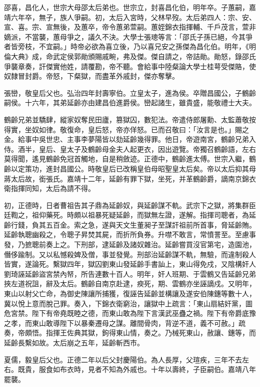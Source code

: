 \begin{pinyinscope}
邵喜，昌化人，世宗大母邵太后弟也。世宗立，封喜昌化伯，明年卒。子蕙嗣，嘉靖六年卒，無子，族人爭嗣。初，太后入宮時，父林早歿。太后弟四人：宗、安、宣、喜。宗、宣無後，及蕙卒，帝令蕙弟萱嗣。蕙姪錦衣指揮輔、千戶茂言，萱非嫡派，不當襲，蕙母爭之，議久不決。大學士張璁等言：「邵氏子孫已絕，今其爭者皆旁枝，不宜嗣。」時帝必欲為喜立後，乃以喜兄安之孫傑為昌化伯。明年，《明倫大典》成，命武定侯郭勛頒賜戚畹，弗及傑。傑自請之，帝詰勛。勛怒，錄邵氏爭襲章奏，訐傑實他姓，請覆勘，帝不聽。會給事中陸粲論大學士桂萼受傑賂，使奴隸冒封爵。帝怒，下粲獄，而盡革外戚封，傑亦奪擊。

張巒，敬皇后父也。弘治四年封壽寧伯。立皇太子，進為侯。卒贈昌國公，子鶴齡嗣侯。十六年，其弟延齡亦由建昌伯進爵侯。巒起諸生，雖貴盛，能敬禮士大夫。

鶴齡兄弟並驕肆，縱家奴奪民田廬，篡獄囚，數犯法。帝遣侍郎屠勳、太監蕭敬按得實，坐奴如律。敬復命，皇后怒，帝亦佯怒。已而召敬曰：「汝言是也。」賜之金。給事中吳世忠、主事李夢陽皆以劾延齡幾得罪。他日，帝遊南宮，鶴齡兄弟入侍。酒半，皇后、皇太子及鶴齡母金夫人起更衣，因出遊覽。帝獨召鶴齡語，左右莫得聞，遙見鶴齡免冠首觸地，自是稍斂迹。正德中，鶴齡進太傅。世宗入繼，鶴齡以定策功，進封昌國公。時敬皇后已改稱皇伯母昭聖皇太后矣。帝以太后抑其母蔣太后故，銜張氏。嘉靖十二年，延齡有罪下獄，坐死，并革鶴齡爵，謫南京錦衣衛指揮同知，太后為請不得。

初，正德時，日者曹祖告其子鼎為延齡奴，與延齡謀不軌。武宗下之獄，將集群臣廷鞫之，祖仰藥死。時頗以祖暴死疑延齡，而獄無左證，遂解。指揮司聰者，為延齡行錢，負其五百金。索之急，遂與天文生董昶子至謀訐祖前所首事，脅延齡賄。延齡執聰幽殺之，令聰子昇焚其屍，而折所負券。升噤不敢言，常憤詈至。至慮事發，乃摭聰前奏上之。下刑部，逮延齡及諸奴雜治。延齡嘗買沒官第宅，造園池，僭侈踰制。又以私憾殺婢及僧，事並發覺。刑部治延齡謀不軌，無驗，而違制殺人皆實，遂論死。繫獄四年，獄囚劉東山發延齡手書訕上，東山得免戍，又陰構奸人劉琦誣延齡盜宮禁內帑，所告連數十百人。明年，奸人班期、于雲鶴又告延齡兄弟挾左道祝詛，辭及太后。鶴齡自南京赴逮，瘐死，期、雲鶴亦坐誣謫戍。又明年，東山以射父亡命，為御史陳讓所捕獲，復誣告延齡並構讓及遂安伯陳鏸等數十人，冀以悅上意而脫己罪。奏入，下錦衣衛窮治，讓獄中上疏言：「東山扇結奸黨，圖危宮禁。陛下有帝堯既睦之德，而東山敢為陛下言漢武巫蠱之禍。陛下有帝爵底豫之孝，而東山敢導陛下以暴秦遷母之謀。離間骨肉，背逆不道，義不可赦。」疏奏，帝頗悟。指揮王佐典其獄，鉤得東山情，奏之。乃械死東山，赦讓、鏸等，而延齡長繫如故。太后崩之五年，延齡斬西市。

夏儒，毅皇后父也。正德二年以后父封慶陽伯。為人長厚，父瑄疾，三年不去左右。既貴，服食如布衣時，見者不知為外戚也。十年以壽終，子臣嗣伯。嘉靖八年罷襲。


\end{pinyinscope}
